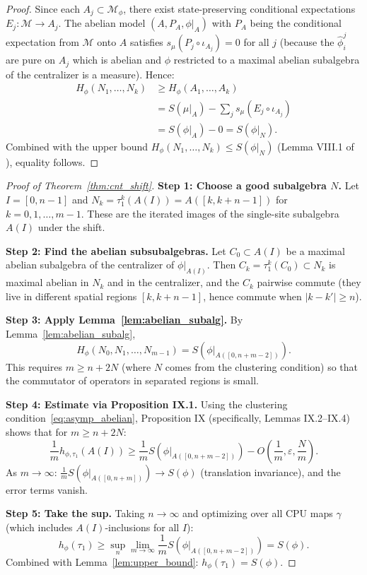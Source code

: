 \documentclass[12pt,a4paper]{article}
\newcommand{\vN}{\mathcal{M}}      %
\newcommand{\Hphi}{H_{\phi}}
\newcommand{\eps}{\varepsilon}
\begin{document}
\begin{proof}
Since each $A_j\subset\vN_\phi$, there exist state-preserving conditional expectations
$E_j:\vN\to A_j$.  The abelian model $(A,P_A,\phi|_A)$ with $P_A$ being the conditional
expectation from $\vN$ onto $A$ satisfies $s_\mu(P_j\circ\iota_{A_j})=0$ for all $j$
(because the $\hat\phi_i^j$ are pure on $A_j$ which is abelian and $\phi$ restricted
to a maximal abelian subalgebra of the centralizer is a measure).
Hence:
\begin{align*}
  \Hphi(N_1,\ldots,N_k)
  &\ge \Hphi(A_1,\ldots,A_k)\\
  &= S(\mu|_A) - \sum_j s_\mu(E_j\circ\iota_{A_j})\\
  &= S(\phi|_A) - 0 = S(\phi|_N).
\end{align*}
Combined with the upper bound $\Hphi(N_1,\ldots,N_k)\le S(\phi|_N)$
(Lemma VIII.1 of \cite{cnt87}), equality follows.
\end{proof}

\begin{proof}[Proof of Theorem~\ref{thm:cnt_shift}]
\textbf{Step 1: Choose a good subalgebra $N$.}
Let $I=[0,n-1]$ and $N_k=\tau_1^k(A(I))=A([k,k+n-1])$ for $k=0,1,\ldots,m-1$.
These are the iterated images of the single-site subalgebra $A(I)$ under the shift.

\textbf{Step 2: Find the abelian subsubalgebras.}
Let $C_0\subset A(I)$ be a maximal abelian subalgebra of the centralizer of $\phi|_{A(I)}$.
Then $C_k=\tau_1^k(C_0)\subset N_k$ is maximal abelian in $N_k$ and in the centralizer,
and the $C_k$ pairwise commute (they live in different spatial regions $[k,k+n-1]$,
hence commute when $|k-k'|\ge n$).

\textbf{Step 3: Apply Lemma~\ref{lem:abelian_subalg}.}
By Lemma~\ref{lem:abelian_subalg},
\begin{equation}\label{eq:step3}
  \Hphi(N_0,N_1,\ldots,N_{m-1})
  = S(\phi|_{A([0,n+m-2])}).
\end{equation}
This requires $m\ge n+2N$ (where $N$ comes from the clustering condition) so that
the commutator of operators in separated regions is small.

\textbf{Step 4: Estimate via Proposition IX.1.}
Using the clustering condition~\eqref{eq:asymp_abelian}, \cite{cnt87} Proposition IX
(specifically, Lemmas IX.2--IX.4) shows that for $m\ge n+2N$:
\begin{equation}\label{eq:step4}
  \frac{1}{m}h_{\phi,\tau_1}(A(I))
  \ge \frac{1}{m} S(\phi|_{A([0,n+m-2])}) - O\!\left(\frac{1}{m},\eps,\frac{N}{m}\right).
\end{equation}
As $m\to\infty$: $\frac{1}{m}S(\phi|_{A([0,n+m])})\to S(\phi)$ (translation invariance),
and the error terms vanish.

\textbf{Step 5: Take the sup.}
Taking $n\to\infty$ and optimizing over all CPU maps $\gamma$
(which includes $A(I)$-inclusions for all $I$):
\begin{equation}
  h_\phi(\tau_1) \ge \sup_n \lim_{m\to\infty} \frac{1}{m}S(\phi|_{A([0,n+m-2])}) = S(\phi).
\end{equation}
Combined with Lemma~\ref{lem:upper_bound}: $h_\phi(\tau_1)=S(\phi)$.
\end{proof}
\end{document}

